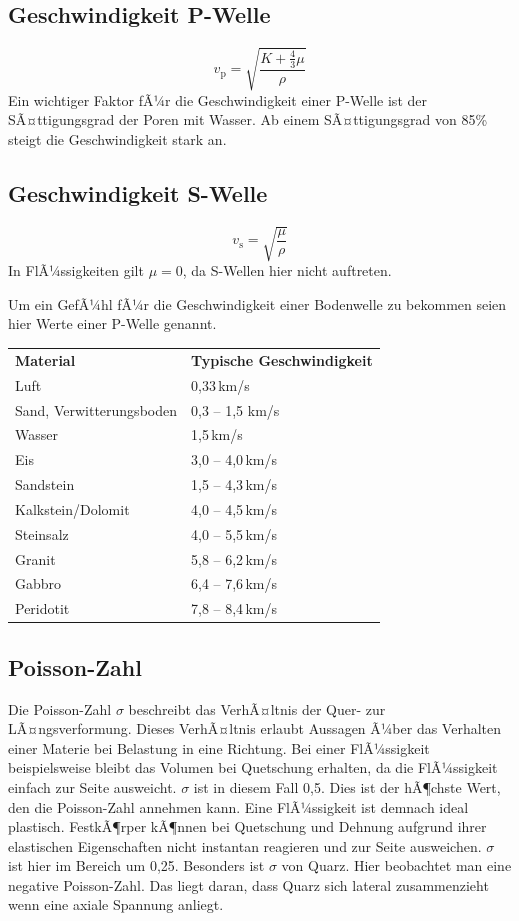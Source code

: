 \subsection{Geschwindigkeit P-Welle}
\begin{equation*}
	v_{\text{p}} = \sqrt{\frac{K + \frac{4}{3} \mu}{\rho}}
\end{equation*}
Ein wichtiger Faktor fÃ¼r die Geschwindigkeit einer P-Welle ist der SÃ¤ttigungsgrad der Poren mit Wasser. Ab einem SÃ¤ttigungsgrad von 85\% steigt die Geschwindigkeit stark an.

\subsection{Geschwindigkeit S-Welle}
\begin{equation*}
	v_{\text{s}} = \sqrt{\frac{\mu}{\rho}}
\end{equation*}
In FlÃ¼ssigkeiten gilt $\mu = 0$, da S-Wellen hier nicht auftreten. \par

Um ein GefÃ¼hl fÃ¼r die Geschwindigkeit einer Bodenwelle zu bekommen seien hier Werte einer P-Welle genannt. 

\begin{tabular}{ll}
	\textbf{Material} & \textbf{Typische Geschwindigkeit}\\
	Luft & 0,33\,\si{km/s} \\
	Sand, Verwitterungsboden & 0,3 -- 1,5 \si{km/s} \\
	Wasser & 1,5\,\si{km/s}\\
	Eis & 3,0 -- 4,0\,\si{km/s}\\
	Sandstein & 1,5 -- 4,3\,\si{km/s}\\
	Kalkstein/Dolomit & 4,0 -- 4,5\,\si{km/s}\\
	Steinsalz & 4,0 -- 5,5\,\si{km/s}\\
	Granit & 5,8 -- 6,2\,\si{km/s}\\
	Gabbro & 6,4 -- 7,6\,\si{km/s}\\
	Peridotit & 7,8 -- 8,4\,\si{km/s}
\end{tabular}

\subsection{Poisson-Zahl}
Die Poisson-Zahl $\sigma$ beschreibt das VerhÃ¤ltnis der Quer- zur LÃ¤ngsverformung. Dieses VerhÃ¤ltnis erlaubt Aussagen Ã¼ber das Verhalten einer Materie bei Belastung in eine Richtung. Bei einer FlÃ¼ssigkeit beispielsweise bleibt das Volumen bei Quetschung erhalten, da die FlÃ¼ssigkeit einfach zur Seite ausweicht. $\sigma$ ist in diesem Fall 0,5. Dies ist der hÃ¶chste Wert, den die Poisson-Zahl annehmen kann. Eine FlÃ¼ssigkeit ist demnach ideal plastisch.
FestkÃ¶rper kÃ¶nnen bei Quetschung und Dehnung aufgrund ihrer elastischen Eigenschaften nicht instantan reagieren und zur Seite ausweichen. $\sigma$ ist hier im Bereich um 0,25. Besonders ist $\sigma$ von Quarz. Hier beobachtet man eine negative Poisson-Zahl. Das liegt daran, dass Quarz sich lateral zusammenzieht wenn eine axiale Spannung anliegt.

